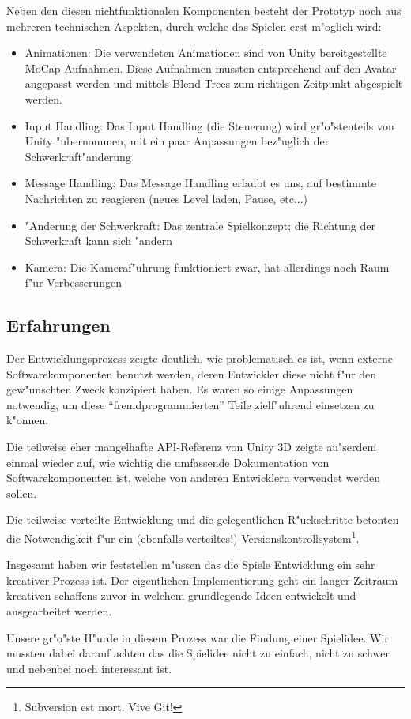 Neben den diesen nichtfunktionalen Komponenten besteht der Prototyp noch aus mehreren technischen
Aspekten, durch welche das Spielen erst m"oglich wird:
\begin{itemize}
	\item Animationen: Die verwendeten Animationen sind von Unity bereitgestellte MoCap Aufnahmen.
		Diese Aufnahmen mussten entsprechend auf den Avatar angepasst werden und mittels Blend Trees zum
		richtigen Zeitpunkt abgespielt werden.
	\item Input Handling: Das Input Handling (die Steuerung) wird gr"o"stenteils von Unity "ubernommen,
		mit ein paar Anpassungen bez"uglich der Schwerkraft"anderung
	\item Message Handling: Das Message Handling erlaubt es uns, auf bestimmte Nachrichten zu reagieren
			(neues Level laden, Pause, etc...)
	\item "Anderung der Schwerkraft: Das zentrale Spielkonzept; die Richtung der Schwerkraft kann sich "andern
	\item Kamera: Die Kameraf"uhrung funktioniert zwar, hat allerdings noch Raum f"ur Verbesserungen
\end{itemize}
%
\subsection{Erfahrungen}
\label{sec:results/xp}
%
Der Entwicklungsprozess zeigte deutlich, wie problematisch es
ist, wenn externe Softwarekomponenten benutzt werden, deren
Entwickler diese nicht f"ur den gew"unschten Zweck konzipiert haben.
Es waren so einige Anpassungen notwendig, um diese
``fremdprogrammierten'' Teile zielf"uhrend einsetzen zu k"onnen.

Die teilweise eher mangelhafte API-Referenz von Unity 3D zeigte
au"serdem einmal wieder auf, wie wichtig die umfassende Dokumentation
von Softwarekomponenten ist, welche von anderen Entwicklern
verwendet werden sollen.

Die teilweise verteilte Entwicklung und die gelegentlichen R"uckschritte
betonten die Notwendigkeit f"ur ein (ebenfalls verteiltes!)
Versionskontrollsystem\footnote{Subversion est mort. Vive Git!}.

Insgesamt haben wir feststellen m"ussen das die Spiele Entwicklung ein sehr kreativer Prozess ist. Der eigentlichen Implementierung geht ein langer Zeitraum kreativen schaffens zuvor in welchem grundlegende Ideen entwickelt und ausgearbeitet werden.

Unsere gr"o"ste H"urde in diesem Prozess war die Findung einer Spielidee. Wir mussten dabei darauf achten das die Spielidee nicht zu einfach, nicht zu schwer und nebenbei noch interessant ist.

